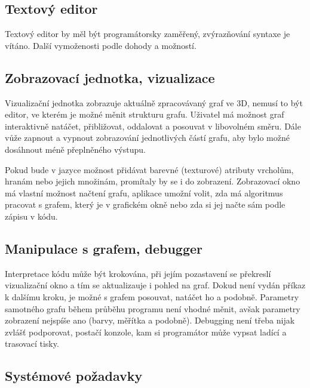\documentclass[11pt,twoside,a4paper]{book}
\begin{document}
\subsection{Textový editor}

Textový editor by měl být programátorsky zaměřený, zvýrazňování syntaxe je vítáno. Další vymoženosti podle dohody a možností.


\subsection{Zobrazovací jednotka, vizualizace}

Vizualizační jednotka zobrazuje aktuálně zpracovávaný graf ve 3D, nemusí to být editor, ve kterém je možné měnit strukturu grafu. Uživatel má možnost graf interaktivně natáčet, přibližovat, oddalovat a posouvat v libovolném směru. Dále vůže zapnout a vypnout zobrazování jednotlivých částí grafu, aby bylo možné dosáhnout méně přeplněného výstupu.

Pokud bude v jazyce možnost přidávat barevné (texturové) atributy vrcholům, hranám nebo jejich množinám, promítaly by se i do zobrazení. Zobrazovací okno má vlastní možnost načtení grafu, aplikace umožní volit, zda má algoritmus pracovat s grafem, který je v grafickém okně nebo zda si jej načte sám podle zápisu v kódu.


\subsection{Manipulace s grafem, debugger}

Interpretace kódu může být krokována, při jejím pozastavení se překreslí vizualizační okno a tím se aktualizauje i pohled na graf. Dokud není vydán příkaz k dalšímu kroku, je možné s grafem posouvat, natáčet ho a podobně. Parametry samotného grafu během průběhu programu není vhodné měnit, avšak parametry zobrazení nejspíše ano (barvy, měřítka a podobně). Debugging není třeba nijak zvlášť podporovat, postačí konzole, kam si programátor může vypsat ladící a trasovací tisky.


\subsection{Systémové požadavky}
\end{document}
